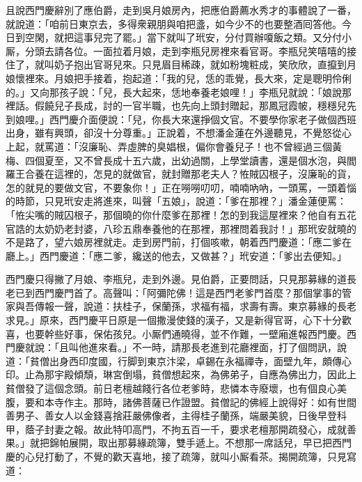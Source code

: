 且說西門慶辭別了應伯爵，走到吳月娘房內，把應伯爵薦水秀才的事體說了一番，就說道：「咱前日東京去，多得衆親朋與咱把盞，如今少不的也要整酒囘答他。今日到空閑，就把這事兒完了罷。」當下就叫了玳安，分付買辦嗄飯之類。又分付小厮，分頭去請各位。一面拉着月娘，走到李瓶兒房裡來看官哥。李瓶兒笑嘻嘻的接住了，就叫奶子抱出官哥兒來。只見眉目稀疎，就如粉塊粧成，笑欣欣，直攛到月娘懷裡來。月娘把手接着，抱起道：「我的兒，恁的乖覺，長大來，定是聰明伶俐的。」又向那孩子說：「兒，長大起來，恁地奉養老娘哩！」李瓶兒就說：「娘說那裡話。假饒兒子長成，討的一官半職，也先向上頭封贈起，那鳳冠霞帔，穩穩兒先到娘哩。」{}西門慶介面便說：「兒，你長大來還掙個文官。不要學你家老子做個西班出身，雖有興頭，卻沒十分尊重。」{}正說着，不想潘金蓮在外邊聽見，不覺怒從心上起，{}就罵道：「沒廉恥、弄虛脾的臭娼根，偏你會養兒子！也不曾經過三個黃梅、四個夏至，又不曾長成十五六歲，出幼過關，上學堂讀書，還是個水泡，與閻羅王合養在這裡的，怎見的就做官，就封贈那老夫人？恠賊囚根子，沒廉恥的貨，怎的就見的要做文官，不要象你！」{}正在嘮嘮叨叨，喃喃吶吶，一頭罵，一頭着惱的時節，只見玳安走將進來，叫聲「五娘」，說道：「爹在那裡？」潘金蓮便罵：「恠尖嘴的賊囚根子，那個曉的你什麼爹在那裡！怎的到我這屋裡來？他自有五花官誥的太奶奶老封婆，八珍五鼎奉養他的在那裡，{}那裡問着我討！」那玳安就曉的不是路了，望六娘房裡就走。{}走到房門前，打個咳嗽，朝着西門慶道：「應二爹在廳上。」西門慶道：「應二爹，纔送的他去，又做甚？」玳安道：「爹出去便知。」

西門慶只得撇了月娘、李瓶兒，走到外邊。見伯爵，正要問話，只見那募緣的道長老已到西門慶門首了。高聲叫：「阿彌陀佛！這是西門老爹門首麼？那個掌事的管家與吾傳報一聲，說道：扶桂子，保蘭孫，求福有福，求壽有壽。{}東京募緣的長老求見。」原來，西門慶平日原是一個撒漫使錢的漢子，又是新得官哥，心下十分歡喜，也要幹些好事，保佑孩兒。小厮們通曉得，並不作難，一壁廂進報西門慶。西門慶就說：「且叫他進來看。」不一時，請那長老進到花廳裡面，打了個問訊，說道：「貧僧出身西印度國，行脚到東京汴梁，卓錫在永福禪寺，面壁九年，頗傳心印。止為那宇殿傾頹，琳宮倒塌，貧僧想起來，為佛弟子，自應為佛出力，因此上貧僧發了這個念頭。前日老檀越餞行各位老爹時，悲憐本寺廢壞，也有個良心美腹，要和本寺作主。那時，諸佛菩薩已作證盟。貧僧記的佛經上說得好：如有世間善男子、善女人以金錢喜捨莊嚴佛像者，主得桂子蘭孫，端嚴美貌，日後早登科甲，蔭子封妻之報。故此特叩高門，不拘五百一千，要求老檀那開疏發心，成就善果。」就把錦帕展開，取出那募緣疏簿，雙手遞上。不想那一席話兒，早已把西門慶的心兒打動了，不覺的歡天喜地，{}接了疏簿，就叫小厮看茶。揭開疏簿，只見寫道：

